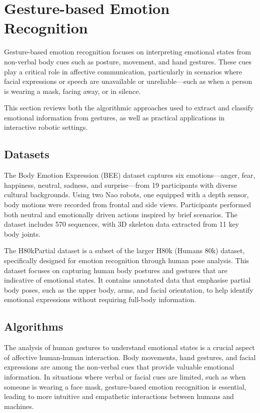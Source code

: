 \section{Gesture-based Emotion Recognition}

Gesture-based emotion recognition focuses on interpreting emotional states from non-verbal body cues such as posture, movement, and hand gestures. These cues play a critical role in affective communication, particularly in scenarios where facial expressions or speech are unavailable or unreliable—such as when a person is wearing a mask, facing away, or in silence.

This section reviews both the algorithmic approaches used to extract and classify emotional information from gestures, as well as practical applications in interactive robotic settings.

\subsection{Datasets}

The Body Emotion Expression (BEE) dataset \cite{Elfaramawy2017-ab} captures six emotions—anger, fear, happiness, neutral, sadness, and surprise—from 19 participants with diverse cultural backgrounds. Using two Nao robots, one equipped with a depth sensor, body motions were recorded from frontal and side views. Participants performed both neutral and emotionally driven actions inspired by brief scenarios. The dataset includes 570 sequences, with 3D skeleton data extracted from 11 key body joints.

The H80kPartial dataset \cite{8578328} is a subset of the larger H80k (Humans 80k) dataset, specifically designed for emotion recognition through human pose analysis. This dataset focuses on capturing human body postures and gestures that are indicative of emotional states. It contains annotated data that emphasise partial body poses, such as the upper body, arms, and facial orientation, to help identify emotional expressions without requiring full-body information.

\subsection{Algorithms}

The analysis of human gestures to understand emotional states is a crucial aspect of affective human-human interaction. Body movements, hand gestures, and facial expressions are among the non-verbal cues that provide valuable emotional information. In situations where verbal or facial cues are limited, such as when someone is wearing a face mask, gesture-based emotion recognition is essential, leading to more intuitive and empathetic interactions between humans and machines.

